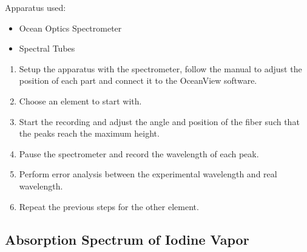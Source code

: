 \documentclass[12pt]{article}
\begin{document}
	Apparatus used:
	\begin{itemize}
		\item Ocean Optics Spectrometer
		\item Spectral Tubes
	\end{itemize}
	\begin{enumerate}
		\item Setup the apparatus with the spectrometer, follow the manual to adjust the position of each part and connect it to the OceanView software.
		\item Choose an element to start with.
		\item Start the recording and adjust the angle and position of the fiber such that the peaks reach the maximum height.
		\item Pause the spectrometer and record the wavelength of each peak.
		\item Perform error analysis between the experimental wavelength and real wavelength.
		\item Repeat the previous steps for the other element.
	\end{enumerate}
	
	\subsection{Absorption Spectrum of Iodine Vapor}
	
\end{document}
